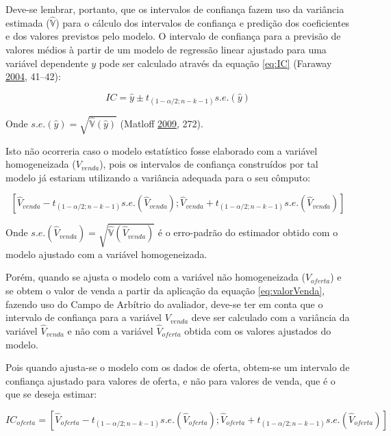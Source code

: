 \documentclass{article}
\begin{document}
Deve-se lembrar, portanto, que os intervalos de confiança fazem uso da
variância estimada (\(\hat{\mathbb{V}}\)) para o cálculo dos intervalos
de confiança e predição dos coeficientes e dos valores previstos pelo
modelo. O intervalo de confiança para a previsão de valores médios à
partir de um modelo de regressão linear ajustado para uma variável
dependente \(y\) pode ser calculado através da equação \ref{eq:IC}
(Faraway \protect\hyperlink{ref-faraway2004linear}{2004}, 41--42):

\begin{equation}
\label{eq:IC}
IC = \hat y \pm t_{(1-\alpha/2; n-k-1)} s.e.(\hat y)
\end{equation}

Onde \(s.e.(\hat y) = \sqrt{\hat{\mathbb{V}} (\hat y)}\) (Matloff
\protect\hyperlink{ref-matloff2009}{2009}, 272).

Isto não ocorreria caso o modelo estatístico fosse elaborado com a
variável homogeneizada (\(V_{venda}\)), pois os intervalos de confiança
construídos por tal modelo já estariam utilizando a variância adequada
para o seu cômputo:

\begin{equation}
\label{eq:ICVenda}
[\hat V_{venda} - t_{(1-\alpha/2; n-k-1)} s.e.(\hat V_{venda}) ;
 \hat V_{venda} + t_{(1-\alpha/2; n-k-1)} s.e.(\hat V_{venda}) ]
\end{equation}

Onde \(s.e.(\hat V_{venda}) = \sqrt{\hat{\mathbb{V}} (\hat V_{venda})}\)
é o erro-padrão do estimador obtido com o modelo ajustado com a variável
homogeneizada.

Porém, quando se ajusta o modelo com a variável não homogeneizada
(\(V_{oferta}\)) e se obtem o valor de venda a partir da aplicação da
equação \ref{eq:valorVenda}, fazendo uso do Campo de Arbítrio do
avaliador, deve-se ter em conta que o intervalo de confiança para a
variável \(V_{venda}\) deve ser calculado com a variância da variável
\(\hat V_{venda}\) e não com a variável \(\hat V_{oferta}\) obtida com
os valores ajustados do modelo.

Pois quando ajusta-se o modelo com os dados de oferta, obtem-se um
intervalo de confiança ajustado para valores de oferta, e não para
valores de venda, que é o que se deseja estimar:

\begin{equation}
\label{eq:ICOferta}
IC_{oferta} = [\hat V_{oferta} - t_{(1-\alpha/2; n-k-1)} s.e.(\hat V_{oferta});
   \hat V_{oferta} + t_{(1-\alpha/2; n-k-1)} s.e.(\hat V_{oferta})]
\end{equation}
\end{document}
